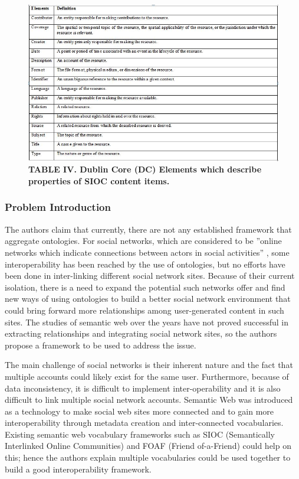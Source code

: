 \documentclass[10pt,journal,compsoc]{IEEEtran}
\begin{document}
\begin{figure}[t]
\begin{center}
\includegraphics[width=7in]{DanielaTable4.JPG}  
\caption*{\textbf{TABLE IV. Dublin Core (DC) Elements which describe properties of SIOC content items.}}     
\label{fig1}
\end{center}
\end{figure}



\subsubsection{Problem Introduction}
The authors claim that currently, there are not any established framework that aggregate ontologies. For social networks, which are considered to be ''online networks which indicate connections between actors in social activities'' \cite{6190504}, some interoperability has been reached by the use of ontologies, but no efforts have been done in inter-linking different social network sites. Because of their current isolation, there is a need to expand the potential such networks offer and find new ways of using ontologies to build a better social network environment that could bring forward more relationships among user-generated content in such sites. The studies of semantic web over the years have not proved successful in extracting relationships and integrating social network sites, so the authors propose a framework to be used to address the issue. 



The main challenge of social networks is their inherent nature and the fact that multiple accounts could likely exist for the same user. Furthermore, because of data inconsistency, it is difficult to implement inter-operability and it is also difficult to link multiple social network accounts. Semantic Web was introduced as a technology to make social web sites more connected and to gain more interoperability through metadata creation and inter-connected vocabularies. Existing semantic web vocabulary frameworks such as SIOC (Semantically Interlinked Online Communities) and FOAF (Friend of-a-Friend) could help on this; hence the authors explain multiple vocabularies could be used together to build a good interoperability framework. 
\end{document}
